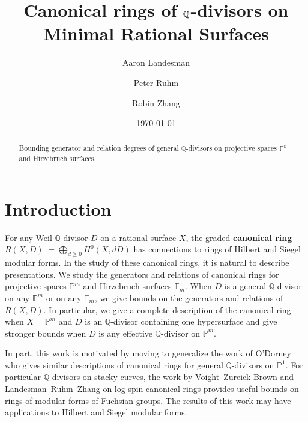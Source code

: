 \documentclass{amsart}
\title{Canonical rings of $\bq$-divisors on Minimal Rational Surfaces}
\author{Aaron Landesman}
\author{Peter Ruhm}
\author{Robin Zhang}
\date{\today}
\theoremstyle{plain}
\theoremstyle{definition}
\theoremstyle{remark}
\numberwithin{equation}{section}
\newcommand\bq{{\mathbb Q}}
\newcommand\bp{{\mathbb P}}
\newcommand\hirz{\mathbb{F}}
\begin{document}
\begin{abstract}
 	Bounding generator and relation degrees of general $\bq$-divisors
	on projective spaces $\bp^n$ and Hirzebruch surfaces.
\end{abstract}

\maketitle
{}


\section{Introduction}
\label{sec:intro}
For any Weil $\bq$-divisor $D$ on a rational surface $X$, the graded
\textbf{canonical ring} $R(X, D) := \bigoplus_{d \geq 0} H^0(X, dD)$
has connections to rings of Hilbert and Siegel modular forms. In the
study of these canonical rings, it is natural to describe
presentations. We study the generators and relations of canonical
rings for projective spaces $\bp^m$ and Hirzebruch surfaces $\hirz_m$.
When $D$ is a general $\bq$-divisor on any $\bp^m$ or on any
$\hirz_m$, we give bounds on the generators and relations of
$R(X, D)$. In particular, we give a complete description of the
canonical ring when $X = \bp^m$ and $D$ is an $\bq$-divisor
containing one hypersurface and give stronger bounds when
$D$ is any effective $\bq$-divisor on $\bp^m$.

In part, this work is motivated by moving to generalize the work
of O'Dorney \cite{dorney:canonical} who gives similar descriptions
of canonical rings for general $\bq$-divisors on $\bp^1$. For
particular $\bq$ divisors on stacky curves, the work by
Voight--Zureick-Brown \cite{vzb:stacky} and Landesman--Ruhm--Zhang
\cite{lrz:spin-cring} on log spin canonical rings provides
useful bounds on rings of modular forms of Fuchsian groups.
The results of this work may have applications to Hilbert
and Siegel modular forms. 



\end{document}
